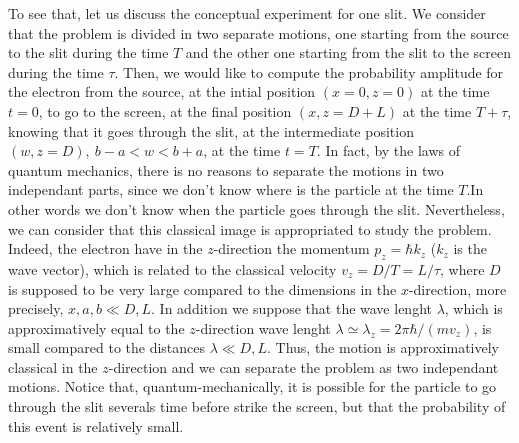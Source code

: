 \documentclass[12pt,aps,prb,preprint]{revtex4-1}   %
\begin{document}
To see that, let us discuss the conceptual experiment for one slit.\cite{FH} 
We consider that the problem is divided 
in two separate motions, one starting from the source to the slit during the time $T$
and the other one starting from the slit to the screen during the time $\tau$. 
Then, we would like to compute the probability amplitude for the electron
from the source, at the intial position $(x=0,z=0)$ at the time $t=0$, 
to go to the screen, at the final position $(x,z=D+L)$ at the time $T+\tau$, 
knowing that it goes through the slit, 
at the intermediate position $(w,z=D),\ b-a<w<b+a$, at the time $t=T$. 
In fact, by the laws of quantum mechanics, there is no reasons
to separate the motions in two independant parts, since we don't know
where is the particle at the time $T$.In other words we don't
know when the particle goes through the slit.
Nevertheless, we can consider that this classical image is appropriated
to study the problem. Indeed, the electron have in the $z$-direction 
the momentum $p_z=\hbar k_z$ ($k_z$ is the wave vector), 
which is related to the classical velocity $v_z=D/T=L/\tau$, 
where $D$ is supposed to be very large compared to the dimensions in the $x$-direction,
more precisely, $x,a,b\ll D,L$. In addition we suppose that the wave lenght $\lambda$, 
which is approximatively equal to the $z$-direction wave lenght $\lambda\simeq\lambda_z=2\pi\hbar/(mv_z)$, 
is small compared to the distances $\lambda\ll D,L$. 
Thus, the motion is approximatively classical in the $z$-direction 
and we can separate the problem as two independant motions.
Notice that, quantum-mechanically, it is possible for the particle to go through the slit 
severals time before strike the screen,\cite{Yabuki}
but that the probability of this event is relatively small. 
\end{document}
